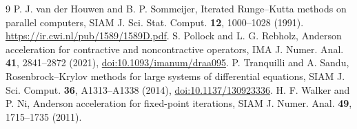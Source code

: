 \documentclass[aps,pra,reprint,onecolumn,12pt,notitlepage,superscriptaddress,nofootinbib]{revtex4-2}
\begin{document}
\begin{thebibliography}{9}
P. J. van der Houwen and B. P. Sommeijer,
Iterated Runge--Kutta methods on parallel computers,
SIAM J. Sci. Stat. Comput. \textbf{12}, 1000--1028 (1991).
\url{https://ir.cwi.nl/pub/1589/1589D.pdf}.
S. Pollock and L. G. Rebholz,
Anderson acceleration for contractive and noncontractive operators,
IMA J. Numer. Anal. \textbf{41}, 2841--2872 (2021),
\href{https://doi.org/10.1093/imanum/draa095}{doi:10.1093/imanum/draa095}.
P. Tranquilli and A. Sandu,
Rosenbrock--Krylov methods for large systems of differential equations,
SIAM J. Sci. Comput. \textbf{36}, A1313--A1338 (2014),
\href{https://doi.org/10.1137/130923336}{doi:10.1137/130923336}.
H. F. Walker and P. Ni,
Anderson acceleration for fixed-point iterations,
SIAM J. Numer. Anal. \textbf{49}, 1715--1735 (2011).
\end{thebibliography}
\end{document}
